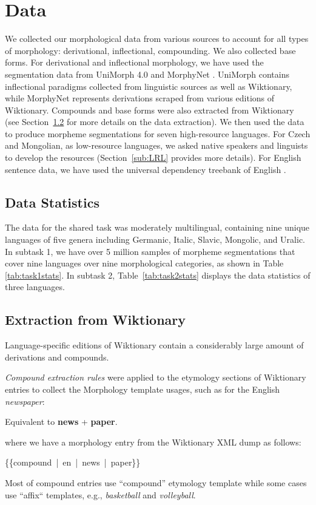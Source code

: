 \documentclass[11pt]{article}
\begin{document}
\section{Data}
\label{sec:Data}
We collected our morphological data from various sources to account for all types of morphology: derivational, inflectional, compounding. We also collected base forms. For derivational and inflectional morphology, we have used the segmentation data from UniMorph 4.0 \cite{batsuren2022unimorph} and MorphyNet \cite{batsuren-etal-2021-morphynet}. UniMorph contains inflectional paradigms collected from linguistic sources as well as Wiktionary, while MorphyNet represents derivations scraped from various editions of Wiktionary. Compounds and base forms were also extracted from Wiktionary (see  Section~\ref{sub:extraction} for more details on the data extraction). We then used the data to produce morpheme segmentations for seven high-resource languages. For Czech and Mongolian, as low-resource languages, we asked native speakers and linguists to develop the resources (Section~\ref{sub:LRL} provides more details). For English sentence data, we have used the universal dependency treebank of English \cite{silveira14gold}. 

\subsection{Data Statistics}
The data for the shared task was moderately multilingual, containing nine unique languages of five genera including Germanic, Italic, Slavic, Mongolic, and Uralic. In subtask 1, we have over 5 million samples of morpheme segmentations that cover nine languages over nine morphological categories, as shown in Table~ \ref{tab:task1stats}. In  subtask 2, Table~\ref{tab:task2stats} displays the data statistics of three languages. 

\subsection{Extraction from Wiktionary}
\label{sub:extraction}
Language-specific editions of Wiktionary contain a considerably large amount of derivations and compounds. 

\emph{Compound extraction rules} were applied to the etymology sections of Wiktionary entries to collect the Morphology template usages, such as for the English \emph{newspaper}:
\begin{center}
     Equivalent to \textbf{news} + \textbf{paper}.
\end{center}
where we have a morphology entry from the Wiktionary XML dump as follows:
\begin{center}
\{\{compound~|~en~|~news~|~paper\}\} 
\end{center}
Most of compound entries use ``compound'' etymology template while some cases use ``affix`` templates, e.g., \emph{basketball} and \emph{volleyball}. 
\end{document}
